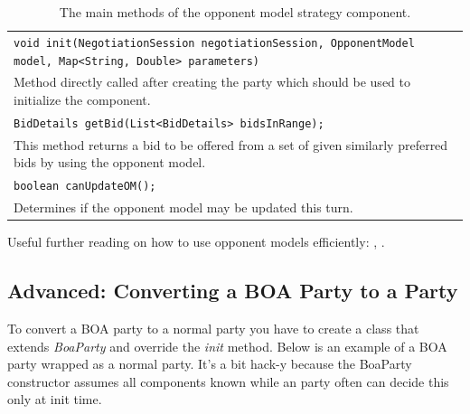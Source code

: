 \documentclass[]{llncs}
\begin{document}
\begin{table}[h]
\begin{tabular}{m{}}
\hline
\texttt{void init(NegotiationSession negotiationSession, OpponentModel model, Map<String, Double> parameters)}\\
Method directly called after creating the party which should be used to initialize the component.\\
\hline
\texttt{BidDetails getBid(List<BidDetails> bidsInRange);}\\
This method returns a bid to be offered from a set of given similarly preferred bids by using the opponent model.\\
\hline
\texttt{boolean canUpdateOM();}\\
Determines if the opponent model may be updated this turn.\\
\hline
\end{tabular}
\caption{The main methods of the opponent model strategy component.}
\label{tab:BOAoms}
\end{table}

Useful further reading on how to use opponent models efficiently: \cite{Hin09Benefits}, \cite{Hin09Opponent}.



\subsection{Advanced: Converting a BOA Party to a Party}
To convert a BOA party to a normal party you have to create a class that extends \textit{BoaParty} and override the \textit{init} method. Below is an example of a BOA party wrapped as a normal party. It's a bit hack-y because the BoaParty constructor assumes all components known  while an party often can decide this only at init time.
\end{document}

